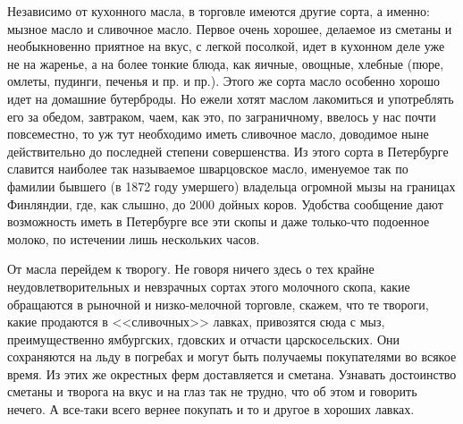 Независимо от кухонного масла, в торговле имеются другие сорта, а именно: мызное масло и сливочное масло. Первое очень хорошее, делаемое из сметаны и необыкновенно приятное на вкус, с легкой посолкой, идет в кухонном деле уже не на жаренье, а на более тонкие блюда, как яичные, овощные, хлебные (пюре, омлеты, пудинги, печенья и пр. и пр.). Этого же сорта масло особенно хорошо идет на домашние бутерброды. Но ежели хотят маслом лакомиться и употреблять его за обедом, завтраком, чаем, как это, по заграничному, ввелось у нас почти повсеместно, то уж тут необходимо иметь сливочное масло, доводимое ныне действительно до последней степени совершенства. Из этого сорта в Петербурге славится наиболее так называемое шварцовское масло, именуемое так по фамилии бывшего (в 1872 году умершего) владельца огромной мызы на границах Финляндии, где, как слышно, до 2000 дойных коров. Удобства сообщение дают возможность иметь в Петербурге все эти скопы и даже только-что подоенное молоко, по истечении лишь нескольких часов.

От масла перейдем к творогу. Не говоря ничего здесь о тех крайне неудовлетворительных и невзрачных сортах этого молочного скопа, какие обращаются в рыночной и низко-мелочной торговле, скажем, что те твороги, какие продаются в <<сливочных>> лавках, привозятся сюда с мыз, преимущественно ямбургских, гдовских и отчасти царскосельских. Они сохраняются на льду в погребах и могут быть получаемы покупателями во всякое время. Из этих же окрестных ферм доставляется и сметана. Узнавать достоинство сметаны и творога на вкус и на глаз так не трудно, что об этом и говорить нечего. А все-таки всего вернее покупать и то и другое в хороших лавках.

